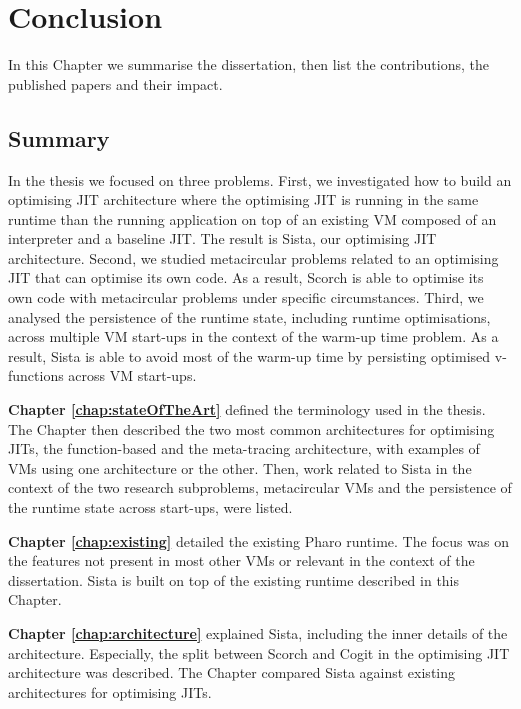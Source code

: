 \documentclass[a4paper,12pt,twoside]{../includes/ThesisStyle}
\begin{document}
\fi

\chapter{Conclusion}
\label{chap:conclusion}
\minitoc

In this Chapter we summarise the dissertation, then list the contributions, the published papers and their impact.

\section{Summary}

In the thesis we focused on three problems. First, we investigated how to build an optimising JIT architecture where the optimising JIT is running in the same runtime than the running application on top of an existing VM composed of an interpreter and a baseline JIT. The result is Sista, our optimising JIT architecture. Second, we studied metacircular problems related to an optimising JIT that can optimise its own code. As a result, Scorch is able to optimise its own code with metacircular problems under specific circumstances. Third, we analysed the persistence of the runtime state, including runtime optimisations, across multiple VM start-ups in the context of the warm-up time problem. As a result, Sista is able to avoid most of the warm-up time by persisting optimised v-functions across VM start-ups.

\hspace{0.5cm} \textbf{Chapter \ref{chap:stateOfTheArt}} defined the terminology used in the thesis. The Chapter then described the two most common architectures for optimising JITs, the function-based and the meta-tracing architecture, with examples of VMs using one architecture or the other. Then, work related to Sista in the context of the two research subproblems, metacircular VMs and the persistence of the runtime state across start-ups, were listed.

\textbf{Chapter \ref{chap:existing}} detailed the existing Pharo runtime. The focus was on the features not present in most other VMs or relevant in the context of the dissertation. Sista is built on top of the existing runtime described in this Chapter.

\textbf{Chapter \ref{chap:architecture}} explained Sista, including the inner details of the architecture. Especially, the split between Scorch and Cogit in the optimising JIT architecture was described. The Chapter compared Sista against existing architectures for optimising JITs.
\end{document}
